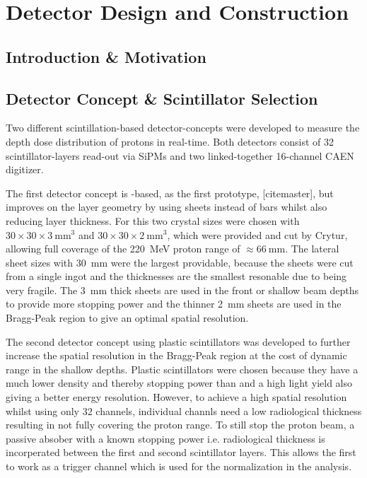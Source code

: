 \chapter{Detector Design and Construction}\label{chapter:setup}

\section{Introduction \& Motivation}

\section{Detector Concept \& Scintillator Selection}\label{section:detector:concept}
Two different scintillation-based detector-concepts were developed to measure the depth dose distribution of protons in real-time.
Both detectors consist of 32 scintillator-layers read-out via \glspl{SiPM} and two linked-together 16-channel CAEN digitizer.

The first detector concept is -based, as the first prototype,  [citemaster], but improves on the layer geometry by using sheets instead of bars whilst also reducing layer thickness.
For this two crystal sizes were chosen with $30\times30\times3~\text{mm}^3$ and $30\times30\times2~\text{mm}^3$, which were provided and cut by Crytur, allowing full coverage of the \SI{220}{\mega\electronvolt} proton range of $\approx \SI{66}{\mm}$.
The lateral sheet sizes with \SI{30}{\mm} were the largest providable, because the sheets were cut from a single ingot and the thicknesses are the smallest resonable due to  being very fragile.
The \SI{3}{\mm} thick sheets are used in the front or shallow beam depths to provide more stopping power and the thinner \SI{2}{\mm} sheets are used in the Bragg-Peak region to give an optimal spatial resolution.

The second detector concept using plastic scintillators was developed to further increase the spatial resolution in the Bragg-Peak region at the cost of dynamic range in the shallow depths. 
Plastic scintillators were chosen because they have a much lower density and thereby stopping power than  and a high light yield also giving a better energy resolution.
However, to achieve a high spatial resolution whilst using only 32 channels, individual channls need a low radiological thickness resulting in not fully covering the proton range.
To still stop the proton beam, a passive absober with a known stopping power i.e. radiological thickness is incorperated between the first and second scintillator layers.
This allows the first to work as a trigger channel which is used for the normalization in the analysis.

